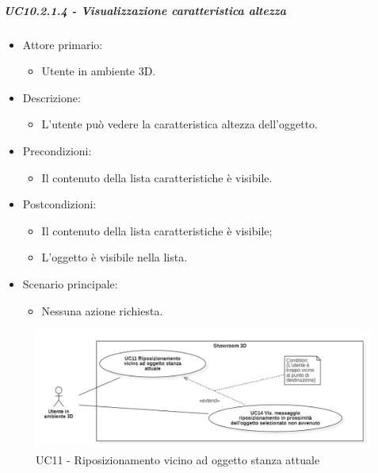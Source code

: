 \subparagraph{UC10.2.1.4 - Visualizzazione caratteristica altezza}
\begin{itemize}

	\item Attore primario: 
	\begin{itemize}
		\item Utente in ambiente 3D.
	\end{itemize}
	\item Descrizione:
	\begin{itemize}
		\item L'utente può vedere la caratteristica altezza dell'oggetto.
	\end{itemize}
	
	\item Precondizioni:
	\begin{itemize}
		\item Il contenuto della lista caratteristiche è visibile.
	\end{itemize}
	
	\item Postcondizioni:
	\begin{itemize}
		\item Il contenuto della lista caratteristiche è visibile;
		\item L'oggetto è visibile nella lista.
	\end{itemize}
	
	\item Scenario principale:
	\begin{itemize}
		\item Nessuna azione richiesta.
	\end{itemize}
	
\end{itemize}

\pagebreak

\begin{figure}[H]
  \renewcommand{\thefigure}{16}
  \includegraphics[width=\linewidth]{./res/images/UC11-14.png}
  \caption{UC11 - Riposizionamento vicino ad oggetto stanza attuale}
  \label{fig:UC 11 e UC14}
\end{figure}

